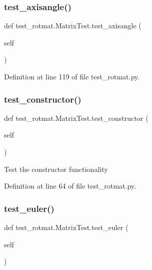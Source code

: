 \subsubsection{\texorpdfstring{test\_axisangle()}{test\_axisangle()}}
{\footnotesize\ttfamily def test\+\_\+rotmat.\+Matrix\+Test.\+test\+\_\+axisangle (\begin{DoxyParamCaption}\item[{}]{self }\end{DoxyParamCaption})}



Definition at line 119 of file test\+\_\+rotmat.\+py.

\mbox{\label{classtest__rotmat_1_1MatrixTest_aeab56837acc2e57cac7c493c05badaa6}} 
\subsubsection{\texorpdfstring{test\_constructor()}{test\_constructor()}}
{\footnotesize\ttfamily def test\+\_\+rotmat.\+Matrix\+Test.\+test\+\_\+constructor (\begin{DoxyParamCaption}\item[{}]{self }\end{DoxyParamCaption})}

\begin{DoxyVerb}Test the constructor functionality\end{DoxyVerb}
 

Definition at line 64 of file test\+\_\+rotmat.\+py.

\mbox{\label{classtest__rotmat_1_1MatrixTest_a1e52b5838a3b190fc65ede505f4823ab}} 
\subsubsection{\texorpdfstring{test\_euler()}{test\_euler()}}
{\footnotesize\ttfamily def test\+\_\+rotmat.\+Matrix\+Test.\+test\+\_\+euler (\begin{DoxyParamCaption}\item[{}]{self }\end{DoxyParamCaption})}

